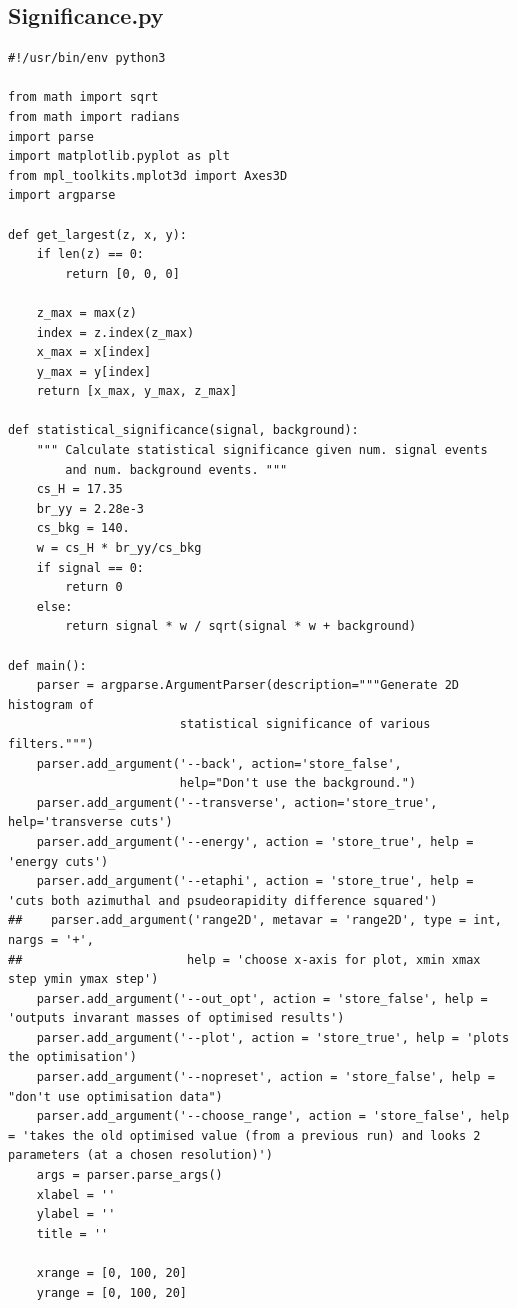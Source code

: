 \documentclass{article}
\begin{document}
\subsection{Significance.py}
\begin{lstlisting}
#!/usr/bin/env python3

from math import sqrt
from math import radians
import parse
import matplotlib.pyplot as plt
from mpl_toolkits.mplot3d import Axes3D
import argparse

def get_largest(z, x, y):
    if len(z) == 0:
        return [0, 0, 0]

    z_max = max(z)
    index = z.index(z_max)
    x_max = x[index]
    y_max = y[index]
    return [x_max, y_max, z_max]

def statistical_significance(signal, background):
    """ Calculate statistical significance given num. signal events
        and num. background events. """
    cs_H = 17.35
    br_yy = 2.28e-3
    cs_bkg = 140.
    w = cs_H * br_yy/cs_bkg
    if signal == 0:
        return 0
    else:
        return signal * w / sqrt(signal * w + background)

def main():
    parser = argparse.ArgumentParser(description="""Generate 2D histogram of
                        statistical significance of various filters.""")
    parser.add_argument('--back', action='store_false',
                        help="Don't use the background.")
    parser.add_argument('--transverse', action='store_true', help='transverse cuts')
    parser.add_argument('--energy', action = 'store_true', help = 'energy cuts')
    parser.add_argument('--etaphi', action = 'store_true', help = 'cuts both azimuthal and psudeorapidity difference squared')
##    parser.add_argument('range2D', metavar = 'range2D', type = int, nargs = '+',
##                       help = 'choose x-axis for plot, xmin xmax step ymin ymax step')
    parser.add_argument('--out_opt', action = 'store_false', help = 'outputs invarant masses of optimised results')
    parser.add_argument('--plot', action = 'store_true', help = 'plots the optimisation')
    parser.add_argument('--nopreset', action = 'store_false', help = "don't use optimisation data")
    parser.add_argument('--choose_range', action = 'store_false', help = 'takes the old optimised value (from a previous run) and looks 2 parameters (at a chosen resolution)')
    args = parser.parse_args()
    xlabel = ''
    ylabel = ''
    title = ''

    xrange = [0, 100, 20]
    yrange = [0, 100, 20]




\end{lstlisting}
\end{document}
